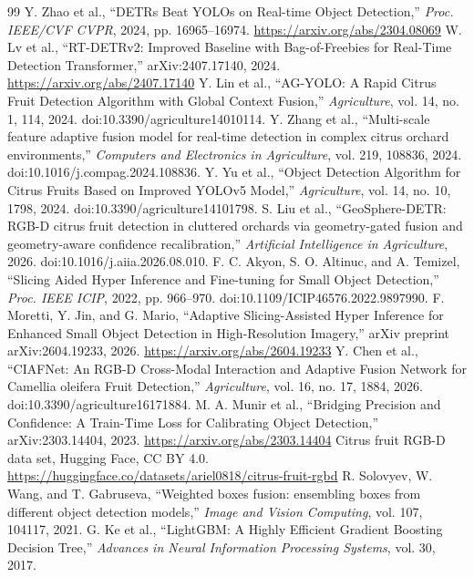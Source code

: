 \documentclass[11pt,a4paper]{ctexart}
\begin{document}
\begin{thebibliography}{99}\small
{} Y. Zhao et al., “DETRs Beat YOLOs on Real-time Object Detection,” \emph{Proc. IEEE/CVF CVPR}, 2024, pp. 16965--16974. \url{https://arxiv.org/abs/2304.08069}
 W. Lv et al., “RT-DETRv2: Improved Baseline with Bag-of-Freebies for Real-Time Detection Transformer,” arXiv:2407.17140, 2024. \url{https://arxiv.org/abs/2407.17140}
 Y. Lin et al., “AG-YOLO: A Rapid Citrus Fruit Detection Algorithm with Global Context Fusion,” \emph{Agriculture}, vol. 14, no. 1, 114, 2024. doi:10.3390/agriculture14010114.
 Y. Zhang et al., “Multi-scale feature adaptive fusion model for real-time detection in complex citrus orchard environments,” \emph{Computers and Electronics in Agriculture}, vol. 219, 108836, 2024. doi:10.1016/j.compag.2024.108836.
 Y. Yu et al., “Object Detection Algorithm for Citrus Fruits Based on Improved YOLOv5 Model,” \emph{Agriculture}, vol. 14, no. 10, 1798, 2024. doi:10.3390/agriculture14101798.
 S. Liu et al., “GeoSphere-DETR: RGB-D citrus fruit detection in cluttered orchards via geometry-gated fusion and geometry-aware confidence recalibration,” \emph{Artificial Intelligence in Agriculture}, 2026. doi:10.1016/j.aiia.2026.08.010.
 F. C. Akyon, S. O. Altinuc, and A. Temizel, “Slicing Aided Hyper Inference and Fine-tuning for Small Object Detection,” \emph{Proc. IEEE ICIP}, 2022, pp. 966--970. doi:10.1109/ICIP46576.2022.9897990.
 F. Moretti, Y. Jin, and G. Mario, “Adaptive Slicing-Assisted Hyper Inference for Enhanced Small Object Detection in High-Resolution Imagery,” arXiv preprint arXiv:2604.19233, 2026. \url{https://arxiv.org/abs/2604.19233}
 Y. Chen et al., “CIAFNet: An RGB-D Cross-Modal Interaction and Adaptive Fusion Network for Camellia oleifera Fruit Detection,” \emph{Agriculture}, vol. 16, no. 17, 1884, 2026. doi:10.3390/agriculture16171884.
 M. A. Munir et al., “Bridging Precision and Confidence: A Train-Time Loss for Calibrating Object Detection,” arXiv:2303.14404, 2023. \url{https://arxiv.org/abs/2303.14404}
 Citrus fruit RGB-D data set, Hugging Face, CC BY 4.0. \url{https://huggingface.co/datasets/ariel0818/citrus-fruit-rgbd}
 R. Solovyev, W. Wang, and T. Gabruseva, “Weighted boxes fusion: ensembling boxes from different object detection models,” \emph{Image and Vision Computing}, vol. 107, 104117, 2021.
 G. Ke et al., “LightGBM: A Highly Efficient Gradient Boosting Decision Tree,” \emph{Advances in Neural Information Processing Systems}, vol. 30, 2017.

\end{thebibliography}
\end{document}
